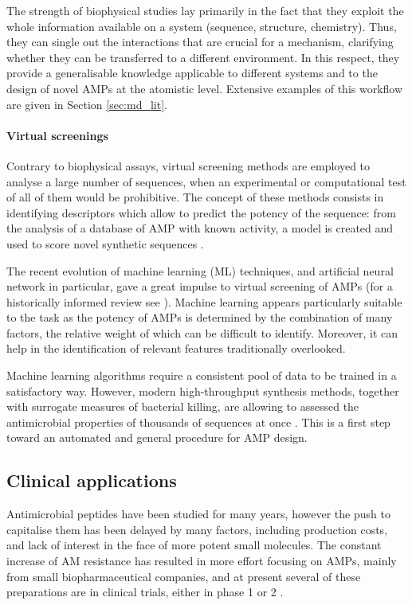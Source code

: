 The strength of biophysical studies lay primarily in the fact that they exploit the whole information available on a system (sequence, structure, chemistry). Thus, they can single out the interactions that are crucial for a mechanism, clarifying whether they can be transferred to a different environment. In this respect, they provide a generalisable knowledge applicable to different systems and to the design of novel AMPs at the atomistic level. Extensive examples of this workflow are given in Section \ref{sec:md_lit}.


\paragraph{Virtual screenings}
Contrary to biophysical assays, virtual screening methods are employed to analyse a large number of sequences, when an experimental or computational test of all of them would be prohibitive. The concept of these methods consists in identifying descriptors which allow to predict the potency of the sequence: from the analysis of a database of AMP with known activity, a model is created and used to score novel synthetic sequences \citep{Fjell2011,Kleandrova2016}.

The recent evolution of machine learning (ML) techniques, and artificial neural network in particular, gave a great impulse to virtual screening of AMPs (for a historically informed review see \citep{Fjell2011,Veltri2018}). Machine learning appears particularly suitable to the task as the potency of AMPs is determined by the combination of many factors, the relative weight of which can be difficult to identify. Moreover, it can help in the identification of relevant features traditionally overlooked.

Machine learning algorithms require a consistent pool of data to be trained in a satisfactory way. However, modern high-throughput synthesis methods, together with surrogate measures of bacterial killing, are allowing to assessed the antimicrobial properties of thousands of sequences at once \citep{Cherkasov2009}. This is a first step toward an automated and general procedure for AMP design.

\subsection{Clinical applications}
Antimicrobial peptides have been studied for many years, however the push to capitalise them has been delayed by many factors, including production costs, and lack of interest in the face of more potent small molecules.
%
The constant increase of AM resistance has resulted in more effort focusing on AMPs, mainly from small biopharmaceutical companies, and at present several of these preparations are in clinical trials, either in phase 1 or 2 \citep{Naafs2018}.

